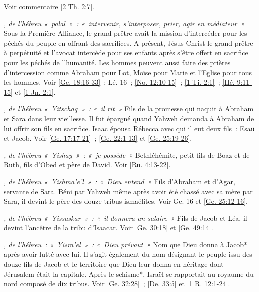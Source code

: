 \begin{multicols}{2}
\textit{}\newline
Voir commentaire \vref{2 Th. 2:7}.

\textit{, de l'hébreu «~palal~»~: «~intervenir, s'interposer, prier, agir en médiateur~»}\newline
Sous la Première Alliance, le grand-prêtre avait la mission d'intercéder pour les péchés du peuple en offrant des sacrifices. A présent, Jésus-Christ le grand-prêtre à perpétuité et l'avocat intercède pour ses enfants après s'être offert en sacrifice pour les péchés de l'humanité. Les hommes peuvent aussi faire des prières d'intercession comme Abraham pour Lot, Moïse pour Marie et l'Eglise pour tous les hommes.\newline
Voir \vref{Ge. 18:16-33}~; Lé. 16~; \vref{No. 12:10-15}~; \vref{1 Ti. 2:1}~; \vref{Hé. 9:11-15} et \vref{1 Jn. 2:1}.

\textit{, de l'hébreu «~Yitschaq~»~: «~il rit~»}\newline
Fils de la promesse qui naquit à Abraham et Sara dans leur vieillesse. Il fut épargné quand Yahweh demanda à Abraham de lui offrir son fils en sacrifice. Isaac épousa Rébecca avec qui il eut deux fils~: Esaü et Jacob.\newline
Voir \vref{Ge. 17:17-21}~; \vref{Ge. 22:1-13} et \vref{Ge. 25:19-26}.

\textit{, de l'hébreu «~Yishay~»~: «~je possède~»}\newline
Bethléhémite, petit-fils de Boaz et de Ruth, fils d'Obed et père de David. Voir \vref{Ru. 4:13-22}.

\textit{, de l'hébreu «~Yishma'e'l~»~: «~Dieu entend~»}\newline
Fils d'Abraham et d'Agar, servante de Sara. Béni par Yahweh même après avoir été chassé avec sa mère par Sara, il devint le père des douze tribus ismaélites.\newline
Voir Ge. 16 et \vref{Ge. 25:12-16}.

\textit{, de l'hébreu «~Yissaskar~»~: «~il donnera un salaire~»}\newline
Fils de Jacob et Léa, il devint l'ancêtre de la tribu d'Isaacar. Voir \vref{Ge. 30:18} et \vref{Ge. 49:14}.

\textit{, de l'hébreu~: «~Yisra'el~»~: «~Dieu prévaut~»}\newline
Nom que Dieu donna à Jacob* après avoir lutté avec lui. Il s'agit également du nom désignant le peuple issu des douze fils de Jacob et le territoire que Dieu leur donna en héritage dont Jérusalem était la capitale. Après le schisme*, Israël se rapportait au royaume du nord composé de dix tribus.\newline
Voir \vref{Ge. 32:28}~; \vref{De. 33:5} et \vref{1 R. 12:1-24}.


\end{multicols}
